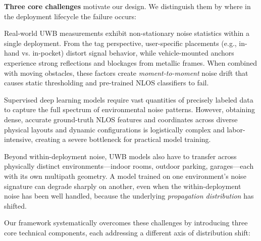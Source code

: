 \documentclass[11pt]{article}
\begin{document}
\bigskip

\noindent\textbf{Three core challenges} motivate our design. We distinguish them by where in the deployment lifecycle the failure occurs:

\begin{description}[leftmargin=1.8cm, style=nextline]
  \item[\textbf{Volatile, Non-Stationary Noise Patterns (within a deployment).}] Real-world UWB measurements exhibit non-stationary noise statistics within a single deployment. From the tag perspective, user-specific placements (e.g., in-hand vs. in-pocket) distort signal behavior, while vehicle-mounted anchors experience strong reflections and blockages from metallic frames. When combined with moving obstacles, these factors create \emph{moment-to-moment} noise drift that causes static thresholding and pre-trained NLOS classifiers to fail.
  \item[\textbf{High Data Acquisition Overhead (labeling cost).}] Supervised deep learning models require vast quantities of precisely labeled data to capture the full spectrum of environmental noise patterns. However, obtaining dense, accurate ground-truth NLOS features and coordinates across diverse physical layouts and dynamic configurations is logistically complex and labor-intensive, creating a severe bottleneck for practical model training.
  \item[\textbf{Limited Cross-Environment Generalization (between deployments).}] Beyond within-deployment noise, UWB models also have to transfer across physically distinct environments---indoor rooms, outdoor parking, garages---each with its own multipath geometry. A model trained on one environment's noise signature can degrade sharply on another, even when the within-deployment noise has been well handled, because the underlying \emph{propagation distribution} has shifted.
\end{description}

\noindent Our framework systematically overcomes these challenges by introducing three core technical components, each addressing a different axis of distribution shift:
\end{document}
